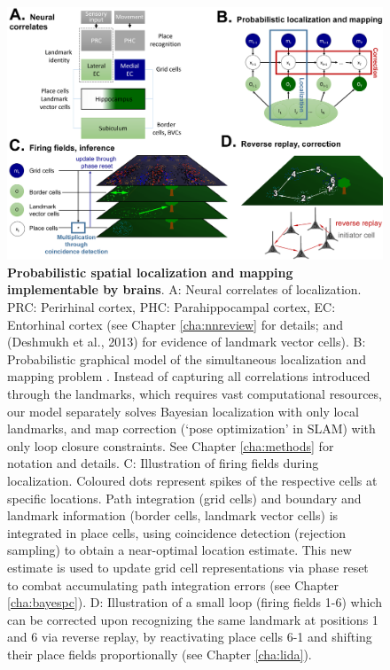 \begin{figure}[h]
	\centering
	\includegraphics[width=\textwidth]{img/neurimpl3}
	\caption[Probabilistic spatial localization and mapping implementable by brains]{\textbf{Probabilistic spatial localization and mapping implementable by brains}. A: Neural correlates of localization. PRC: Perirhinal cortex, PHC: Parahippocampal cortex, EC: Entorhinal cortex (see Chapter \ref{cha:nnreview} for details; and (Deshmukh et al., 2013) for evidence of landmark vector cells). B: Probabilistic graphical model of the simultaneous localization and mapping problem \citep{thrun2008simultaneous}. Instead of capturing all correlations introduced through the landmarks, which requires vast computational resources, our model separately solves Bayesian localization with only local landmarks, and map correction (`pose optimization' in SLAM) with only loop closure constraints. See Chapter \ref{cha:methods} for notation and details. C: Illustration of firing fields during localization. Coloured dots represent spikes of the respective cells at specific locations. Path integration (grid cells) and boundary and landmark information (border cells, landmark vector cells) is integrated in place cells, using coincidence detection (rejection sampling) to obtain a near-optimal location estimate. This new estimate is used to update grid cell representations via phase reset to combat accumulating path integration errors (see Chapter \ref{cha:bayespc}). D: Illustration of a small loop (firing fields 1-6) which can be corrected upon recognizing the same landmark at positions 1 and 6 via reverse replay, by reactivating place cells 6-1 and shifting their place fields proportionally (see Chapter \ref{cha:lida}).
	} 
	\label{fig:neurimpl}
\end{figure}

